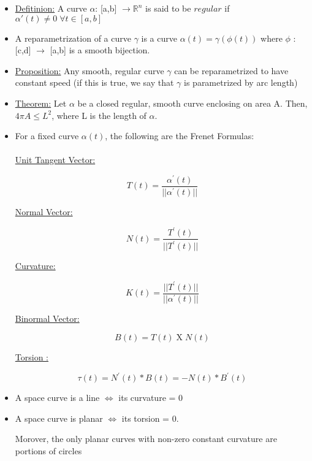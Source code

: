 \documentclass[11pt]{article}
\begin{document}
\begin{itemize}

\item

\underline{Defitinion:} A curve $\alpha$: [a,b] $\rightarrow \mathbb{R}^n$ is said to be $regular$ if $\alpha'(t) \neq 0 \; \forall t \in [a,b]$

\item A reparametrization of a curve $\gamma$ is a curve $\alpha(t) = \gamma(\phi(t))$ where $\phi$ : [c,d] $\rightarrow$ [a,b] is a smooth bijection.

\item \underline{Proposition:} Any smooth, regular curve $\gamma$ can be reparametrized to have constant speed (if this is true, we say that $\gamma$ is parametrized by arc length)

\item \underline{Theorem:} Let $\alpha$ be a closed regular, smooth curve enclosing on area A. Then, $4\pi A \leq L^2$, where L is the length of $\alpha$.

\item For a fixed curve $\alpha(t)$, the following are the Frenet Formulas: \\ \\

\underline{Unit Tangent Vector:}

$$ T(t) = \frac{\alpha ^{'}(t)}{||\alpha ^{'}(t)||} $$

\underline{Normal Vector:}

$$ N(t) = \frac{T ^{'}(t)}{||T ^{'}(t)||} $$

\underline{Curvature:}

$$ K(t) = \frac{||T ^{'}(t)||}{||\alpha ^{'}(t)||} $$

\underline{Binormal Vector:}

$$ B(t) = T(t) \; \text{X} \; N(t) $$

\underline{Torsion :}

$$ \tau(t) = N^{'}(t)*B(t) = -N(t)*B^{'}(t) $$


\item A space curve is a line $\iff$ its curvature = 0

\item A space curve is planar $\iff$ its torsion = 0.

Morover, the only planar curves with non-zero constant curvature are portions of circles

\end{itemize}
\end{document}
